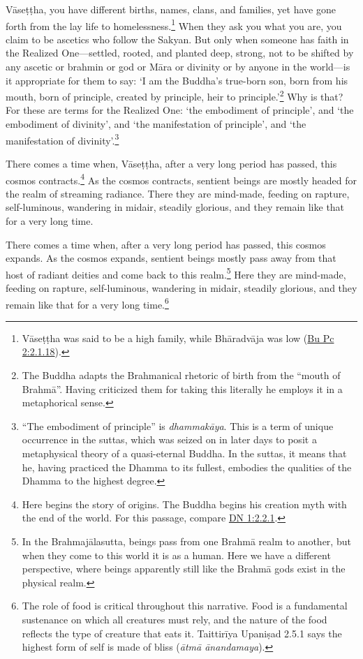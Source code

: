 \documentclass[12pt,openany]{book}%
\begin{document}
\textsanskrit{Vāseṭṭha}, you have different births, names, clans, and families, yet have gone forth from the lay life to homelessness.\footnote{\textsanskrit{Vāseṭṭha} was said to be a high family, while \textsanskrit{Bhāradvāja} was low (\href{https://suttacentral.net/pli-tv-bu-vb-pc2/en/sujato\#2.1.18}{Bu Pc 2:2.1.18}). } When they ask you what you are, you claim to be ascetics who follow the Sakyan. But only when someone has faith in the Realized One—settled, rooted, and planted deep, strong, not to be shifted by any ascetic or brahmin or god or \textsanskrit{Māra} or divinity or by anyone in the world—is it appropriate for them to say: ‘I am the Buddha’s true-born son, born from his mouth, born of principle, created by principle, heir to principle.’\footnote{The Buddha adapts the Brahmanical rhetoric of birth from the “mouth of \textsanskrit{Brahmā}”. Having criticized them for taking this literally he employs it in a metaphorical sense. } Why is that? For these are terms for the Realized One: ‘the embodiment of principle’, and ‘the embodiment of divinity’, and ‘the manifestation of principle’, and ‘the manifestation of divinity’.\footnote{“The embodiment of principle” is \textit{\textsanskrit{dhammakāya}}. This is a term of unique occurrence in the suttas, which was seized on in later days to posit a metaphysical theory of a quasi-eternal Buddha. In the suttas, it means that he, having practiced the Dhamma to its fullest, embodies the qualities of the Dhamma to the highest degree. } 

There comes a time when, \textsanskrit{Vāseṭṭha}, after a very long period has passed, this cosmos contracts.\footnote{Here begins the story of origins. The Buddha begins his creation myth with the end of the world. For this passage, compare \href{https://suttacentral.net/dn1/en/sujato\#2.2.1}{DN 1:2.2.1}. } As the cosmos contracts, sentient beings are mostly headed for the realm of streaming radiance. There they are mind-made, feeding on rapture, self-luminous, wandering in midair, steadily glorious, and they remain like that for a very long time. 

There comes a time when, after a very long period has passed, this cosmos expands. As the cosmos expands, sentient beings mostly pass away from that host of radiant deities and come back to this realm.\footnote{In the \textsanskrit{Brahmajālasutta}, beings pass from one \textsanskrit{Brahmā} realm to another, but when they come to this world it is as a human. Here we have a different perspective, where beings apparently still like the \textsanskrit{Brahmā} gods exist in the physical realm. } Here they are mind-made, feeding on rapture, self-luminous, wandering in midair, steadily glorious, and they remain like that for a very long time.\footnote{The role of food is critical throughout this narrative. Food is a fundamental sustenance on which all creatures must rely, and the nature of the food reflects the type of creature that eats it. \textsanskrit{Taittirīya} \textsanskrit{Upaniṣad} 2.5.1 says the highest form of self is made of bliss (\textit{\textsanskrit{ātmā} \textsanskrit{ānandamaya}}). } 
\end{document}
